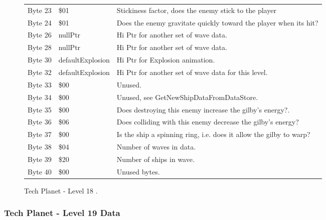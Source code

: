 \begin{figure}[H]
{\begin{adjustbox}{width=12cm}
\begin{tabular}{lll}
 Byte 23 & \$01                        & Stickiness factor, does the enemy stick to the player              \\
 Byte 24 & \$01                        & Does the enemy gravitate quickly toward the player when its hit?   \\
 Byte 26 & nullPtr                    & Hi Ptr for another set of wave data.                               \\
 Byte 28 & nullPtr                    & Hi Ptr for another set of wave data.                               \\
 Byte 30 & defaultExplosion           & Hi Ptr for Explosion animation.                                    \\
 Byte 32 & defaultExplosion           & Hi Ptr for another set of wave data for this level.                \\
 Byte 33 & \$00                        & Unused.                                                            \\
 Byte 34 & \$00                        & Unused, see GetNewShipDataFromDataStore.                           \\
 Byte 35 & \$00                        & Does destroying this enemy increase the gilby's energy?.           \\
 Byte 36 & \$06                        & Does colliding with this enemy decrease the gilby's energy?        \\
 Byte 37 & \$00                        & Is the ship a spinning ring, i.e. does it allow the gilby to warp? \\
 Byte 38 & \$04                        & Number of waves in data.                                           \\
 Byte 39 & \$20                        & Number of ships in wave.                                           \\
 Byte 40 & \$00                        & Unused bytes.                                                      \\
\bottomrule
\end{tabular}

  \end{adjustbox}

  }\caption*{Tech Planet - Level 18
.}
\end{figure}

\clearpage
\subsubsection{Tech Planet - Level 19 Data}

